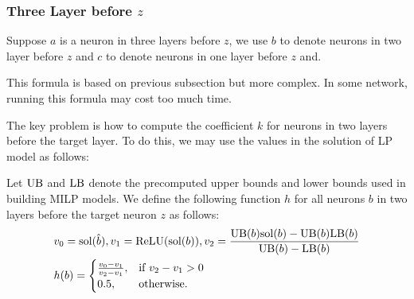 \iffalse
\subsubsection*{Three Layer before  $z$} 

Suppose $a$ is a neuron in three layers before $z$, we use $b$ to denote neurons in two layer before $z$ and $c$ to denote neurons in one layer before $z$ and. 

This formula is based on previous subsection but more complex. In some network, running this formula may cost too much time. 

The key problem is how to compute the coefficient $k$ for neurons in two layers before the target layer. To do this, we may use the values in the solution of LP model as follows:

\begin{definition}\label{3layer}
Let $\mathrm{UB}$ and $\mathrm{LB}$ denote the precomputed upper bounds and lower bounds used in building MILP models. We define the following function $h$ for all neurons $b$ in two layers before the target neuron $z$ as follows:
	\begin{align}
		&v_0 = \mathrm{sol}(\hat{b}), v_1 = \mathrm{ReLU}(\mathrm{sol}(b)), v_2 = \frac{\mathrm{UB}(b)\mathrm{sol}(b)-\mathrm{UB}(b)\mathrm{LB}(b)}{\mathrm{UB}(b)-\mathrm{LB}(b)}\\
		&h(b) =
		\begin{cases}
			\frac{v_0-v_1}{v_2-v_1}, & \text{if } v_2-v_1 > 0\\
			0.5, & \text{otherwise.}
		\end{cases}
	\end{align} 
\end{definition} 

